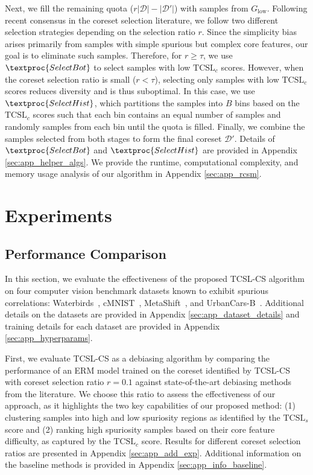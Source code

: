 \documentclass[letter,11pt]{article}
\begin{document}
Next, we fill the remaining quota ($r|\mathcal{D}| - |\mathcal{D}'|$) with samples from $G_{\text{low}}$. Following recent consensus in the coreset selection literature, we follow two different selection strategies depending on the selection ratio $r$. Since the simplicity bias arises primarily from samples with simple spurious but complex core features, our goal is to eliminate such samples. Therefore, for $r \geq \tau$, we use $\textproc{SelectBot}$ to select samples with low $\text{TCSL}_c$ scores. However, when the coreset selection ratio is small ($r < \tau$), selecting only samples with low $\text{TCSL}_c$ scores reduces diversity and is thus suboptimal. In this case, we use $\textproc{SelectHist}$, which partitions the samples into $B$ bins based on the $\text{TCSL}_c$ scores such that each bin contains an equal number of samples and randomly samples from each bin until the quota is filled. Finally, we combine the samples selected from both stages to form the final coreset $\mathcal{D}'$. Details of $\textproc{SelectBot}$ and $\textproc{SelectHist}$ are provided in Appendix \ref{sec:app_helper_algs}. We provide the runtime, computational complexity, and memory usage analysis of our algorithm in Appendix \ref{sec:app_rcsm}.
\section{Experiments}\label{sec:exp}

\subsection{Performance Comparison}

In this section, we evaluate the effectiveness of the proposed TCSL-CS algorithm on four computer vision benchmark datasets known to exhibit spurious correlations: Waterbirds~\citep{Waterbirds}, cMNIST~\citep{Cmnist}, MetaShift~\citep{Metashift}, and UrbanCars-B~\citep{Urbancars}. Additional details on the datasets are provided in Appendix \ref{sec:app_dataset_details} and training details for each dataset are provided in Appendix \ref{sec:app_hyperparams}.

First, we evaluate TCSL-CS as a debiasing algorithm by comparing the performance of an ERM model trained on the coreset identified by TCSL-CS with coreset selection ratio $r\!=\!0.1$ against state-of-the-art debiasing methods from the literature. We choose this ratio to assess the effectiveness of our approach, as it highlights the two key capabilities of our proposed method: (1) clustering samples into high and low spuriosity regions as identified by the $\text{TCSL}_s$ score and (2) ranking high spuriosity samples based on their core feature difficulty, as captured by the $\text{TCSL}_c$ score. Results for different coreset selection ratios are presented in Appendix \ref{sec:app_add_exp}. Additional information on the baseline methods is provided in Appendix \ref{sec:app_info_baseline}.
\end{document}
